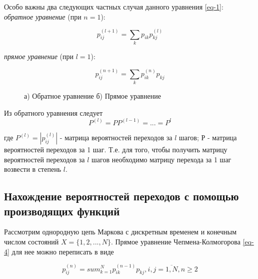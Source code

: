 Особо важны два следующих частных случая данного уравнения \eqref{eq-1}: \\
\textit{обратное уравнение} (при $n = 1$):

\begin{equation}\label{eq-3}
	p_{ij}^{(l + 1)} = \sum_{k} p_{ik}p_{kj}^{(l)}
\end{equation}

\textit{прямое уравнение} (при $l = 1$):

\begin{equation}\label{eq-4}
	p_{ij}^{(n + 1)} = \sum_{k} p_{ik}^{(n)} p_{kj}
\end{equation}

\begin{figure}[H]
    \begin{minipage}[h]{0.49\linewidth}
    \end{minipage}
    \hfill
    \begin{minipage}[h]{0.49\linewidth}
    \end{minipage}
    \caption{а) Обратное уравнение б) Прямое уравнение}
\end{figure}

Из обратного уравнения следует
$$P^{(l)} = PP^{(l - 1)} = ... = P^l$$

где $P^{(l)} = \left| p_{ij}^{(l)}\right|$  - матрица вероятностей переходов за $l$ шагов; Р - матрица вероятностей переходов за 1 шаг. Т.е. для того, чтобы получить матрицу вероятностей переходов за $l$ шагов необходимо матрицу перехода за 1 шаг возвести в степень $l$.

\subsection{Нахождение вероятностей переходов с помощью производящих функций} 

Рассмотрим однородную цепь Маркова с дискретным временем и конечным числом состояний $X = \{1, 2, ..., N\}$. Прямое уравнение Чепмена-Колмогорова \eqref{eq-4} для нее можно переписать в виде

\begin{equation}\label{eq-5}
	p_{ij}^{(n)} = sum_{k = 1}^{N} p_{ik}^{(n - 1)}p_{kj}, i,j = \overline{1, N}, n \geq 2
\end{equation}

